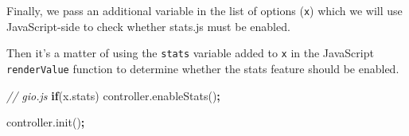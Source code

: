 \documentclass[
]{krantz}
\makeatletter
\newenvironment{Shaded}{\begin{snugshade}}{\end{snugshade}}
\newcommand{\AttributeTok}[1]{\textcolor[rgb]{0.61,0.61,0.61}{#1}}
\newcommand{\CommentTok}[1]{\textcolor[rgb]{0.37,0.37,0.37}{\textit{#1}}}
\newcommand{\ControlFlowTok}[1]{\textcolor[rgb]{0.27,0.27,0.27}{\textbf{#1}}}
\newcommand{\DataTypeTok}[1]{\textcolor[rgb]{0.27,0.27,0.27}{#1}}
\newcommand{\KeywordTok}[1]{\textcolor[rgb]{0.27,0.27,0.27}{\textbf{#1}}}
\newcommand{\NormalTok}[1]{#1}
\newcommand{\OperatorTok}[1]{\textcolor[rgb]{0.43,0.43,0.43}{\textbf{#1}}}
\newcommand{\OtherTok}[1]{\textcolor[rgb]{0.37,0.37,0.37}{#1}}
\newcommand{\StringTok}[1]{\textcolor[rgb]{0.5,0.5,0.5}{#1}}
\newcommand{\VariableTok}[1]{\textcolor[rgb]{0,0,0}{#1}}
\newenvironment{kframe}{%
\medskip{}
\setlength{\fboxsep}{.8em}
 \def\at@end@of@kframe{}%
 \ifinner\ifhmode%
  \def\at@end@of@kframe{\end{minipage}}%
  \begin{minipage}{\columnwidth}%
 \fi\fi%
 \def\FrameCommand##1{\hskip\@totalleftmargin \hskip-\fboxsep
 \colorbox{shadecolor}{##1}\hskip-\fboxsep
     \hskip-\linewidth \hskip-\@totalleftmargin \hskip\columnwidth}%
 \MakeFramed {\advance\hsize-\width
   \@totalleftmargin\z@ \linewidth\hsize
   \@setminipage}}%
 {\par\unskip\endMakeFramed%
 \at@end@of@kframe}
\renewenvironment{Shaded}{\begin{kframe}}{\end{kframe}}
\makeatother
\begin{document}
Finally, we pass an additional variable in the list of options (\texttt{x}) which we will use JavaScript-side to check whether stats.js must be enabled.

\begin{Shaded}
\end{Shaded}

Then it's a matter of using the \texttt{stats} variable added to \texttt{x} in the JavaScript \texttt{renderValue} function to determine whether the stats feature should be enabled.

\begin{Shaded}
\begin{Highlighting}[]
\CommentTok{// gio.js}
\ControlFlowTok{if}\NormalTok{(}\VariableTok{x}\NormalTok{.}\AttributeTok{stats}\NormalTok{)}
  \VariableTok{controller}\NormalTok{.}\AttributeTok{enableStats}\NormalTok{()}\OperatorTok{;}

\VariableTok{controller}\NormalTok{.}\AttributeTok{init}\NormalTok{()}\OperatorTok{;}
\end{Highlighting}
\end{Shaded}
\end{document}
